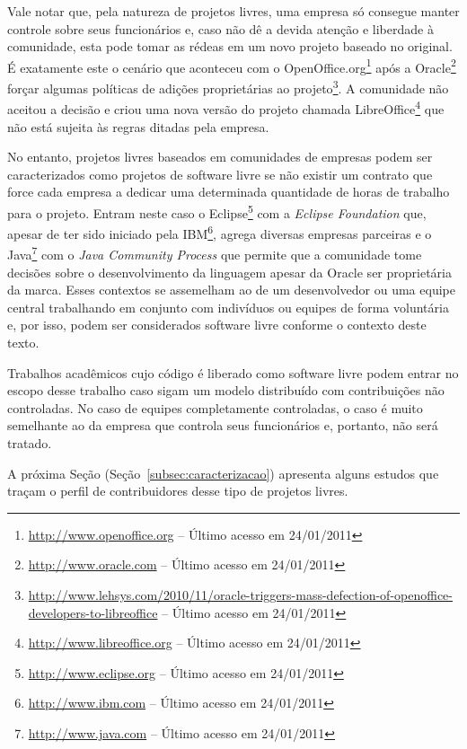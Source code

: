 Vale notar que, pela natureza de projetos livres, uma empresa só
consegue manter controle sobre seus funcionários e, caso não dê a
devida atenção e liberdade à comunidade, esta pode tomar as rédeas em
um novo projeto baseado no original.  É exatamente este o cenário que
aconteceu com o
OpenOffice.org\footnote{\url{http://www.openoffice.org} -- Último
  acesso em 24/01/2011} após a
Oracle\footnote{\url{http://www.oracle.com} -- Último acesso em
  24/01/2011} forçar algumas políticas de adições proprietárias ao
projeto\footnote{\url{http://www.lehsys.com/2010/11/oracle-triggers-mass-defection-of-openoffice-developers-to-libreoffice}
  -- Último acesso em 24/01/2011}. A comunidade não aceitou a decisão
e criou uma nova versão do projeto chamada
LibreOffice\footnote{\url{http://www.libreoffice.org} -- Último acesso
  em 24/01/2011} que não está sujeita às regras ditadas pela empresa.

No entanto, projetos livres baseados em comunidades de empresas podem
ser caracterizados como projetos de software livre se não existir um
contrato que force cada empresa a dedicar uma determinada quantidade
de horas de trabalho para o projeto. Entram neste caso o
Eclipse\footnote{\url{http://www.eclipse.org} -- Último acesso em
  24/01/2011} com a \emph{Eclipse Foundation} que, apesar de ter sido
iniciado pela IBM\footnote{\url{http://www.ibm.com} -- Último acesso
  em 24/01/2011}, agrega diversas empresas parceiras e o
Java\footnote{\url{http://www.java.com} -- Último acesso em
  24/01/2011} com o \emph{Java Community Process} que permite que a
comunidade tome decisões sobre o desenvolvimento da linguagem apesar
da Oracle ser proprietária da marca. Esses contextos se assemelham ao
de um desenvolvedor ou uma equipe central trabalhando em conjunto com
indivíduos ou equipes de forma voluntária e, por isso, podem ser
considerados software livre conforme o contexto deste texto.

Trabalhos acadêmicos cujo código é liberado como software livre podem
entrar no escopo desse trabalho caso sigam um modelo distribuído com
contribuições não controladas. No caso de equipes completamente
controladas, o caso é muito semelhante ao da empresa que controla seus
funcionários e, portanto, não será tratado.

A próxima Seção (Seção~\ref{subsec:caracterizacao}) apresenta alguns
estudos que traçam o perfil de contribuidores desse tipo de projetos
livres.


